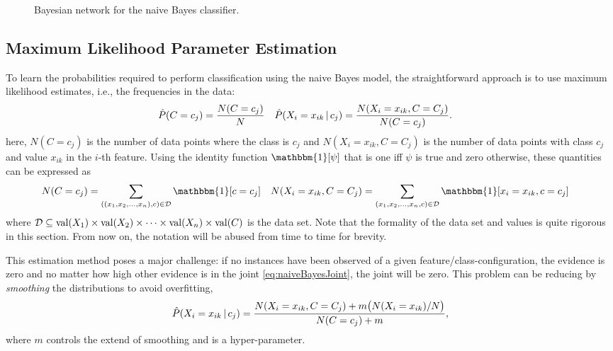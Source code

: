 		\begin{figure}
			\centering
			\caption[Naive Bayes Bayesian Network]{Bayesian network for the naive Bayes classifier.}
			\label{fig:naiveBayes}
		\end{figure}

		\subsection{Maximum Likelihood Parameter Estimation}
			To learn the probabilities required to perform classification using the naive Bayes model, the straightforward approach is to use maximum likelihood estimates, i.e., the frequencies in the data:
			\begin{align}
				\hat{P}(C = c_j) &= \frac{N(C = c_j)}{N} &
				\hat{P}(X_i = x_{ik} \,\vert\, c_j) &= \frac{N(X_i = x_{ik}, C = C_j)}{N(C = c_j)}.
			\end{align}
			here, \( N(C = c_j) \) is the number of data points where the class is \(c_j\) and \( N(X_i = x_{ik}, C = C_j) \) is the number of data points with class \( c_j \) and value \(x_{ik}\) in the \(i\)-th feature. Using the identity function \(\mathbbm{1}[\psi]\) that is one iff \(\psi\) is true and zero otherwise, these quantities can be expressed as
			\begin{align}
				N(C = c_j) &= \sum_{((x_1, x_2, \dots, x_n), c) \in \mathcal{D}} \mathbbm{1}[c = c_j] &
				N(X_i = x_{ik}, C = C_j) &= \sum_{(x_1, x_2, \dots, x_n, c) \in \mathcal{D}} \mathbbm{1}[x_i = x_{ik}, c = c_j]
			\end{align}
			where \( \mathcal{D} \subseteq \operatorname{val}(X_1) \times \operatorname{val}(X_2) \times \dots \times \operatorname{val}(X_n) \times \operatorname{val}(C) \) is the data set. Note that the formality of the data set and values is quite rigorous in this section. From now on, the notation will be abused from time to time for brevity.

			This estimation method poses a major challenge: if no instances have been observed of a given feature/class-configuration, the evidence is zero and no matter how high other evidence is in the joint \eqref{eq:naiveBayesJoint}, the joint will be zero. This problem can be reducing by \emph{smoothing} the distributions to avoid overfitting,
			\begin{equation}
				\hat{P}(X_i = x_{ik} \,\vert\, c_j) = \frac{N(X_i = x_{ik}, C = C_j) + m \bigl( N(X_i = x_{ik}) / N \bigr)}{N(C = c_j) + m},
			\end{equation}
			where \(m\) controls the extend of smoothing and is a hyper-parameter.

